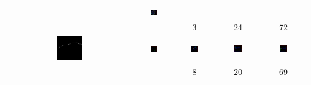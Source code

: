 \documentclass[10pt,a4paper,oneside]{article}
\theoremstyle{definition}
\begin{document}
\begin{table}[p]
\begin{tabular}{c c c c c}
& 
    \includegraphics[width=0.2\textwidth]{../img/runs2d/ball/generation0072.png}
\\   
 &   & 3  & 24 & 72 \\
	\includegraphics[width=0.2\textwidth]{../img/runs2d/coast/data.png}
& 
    \includegraphics[width=0.2\textwidth]{../img/runs2d/coast/generation0000.png}
& 
    \includegraphics[width=0.2\textwidth]{../img/runs2d/coast/generation0008.png}
& 
    \includegraphics[width=0.2\textwidth]{../img/runs2d/coast/generation0020.png}
& 
    \includegraphics[width=0.2\textwidth]{../img/runs2d/coast/generation0069.png}
\\
 &  & 8 & 20 & 69 \\
\hline 


\end{tabular}
\end{table}
\end{document}

